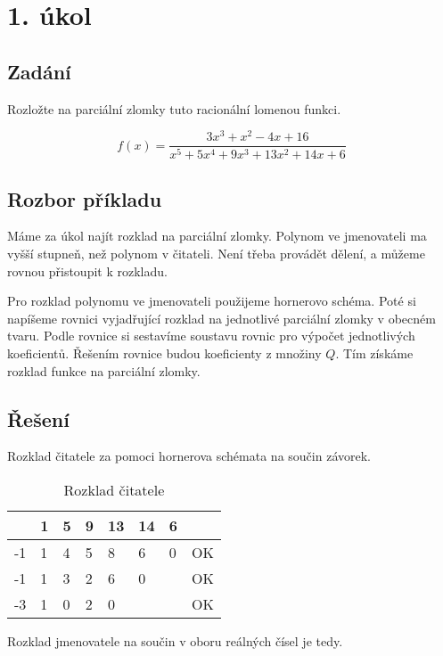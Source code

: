 \section{1. úkol}

\subsection{Zadání}
Rozložte na parciální zlomky tuto racionální lomenou funkci.

\begin{displaymath}
f(x)=\frac{3x^3+x^2-4x+16}{x^5+5x^4+9x^3+13x^2+14x+6}
\end{displaymath}

\subsection{Rozbor příkladu}
Máme za úkol najít rozklad na parciální zlomky. Polynom ve jmenovateli ma vyšší stupneň, než polynom v čitateli. Není třeba provádět dělení, a můžeme rovnou přistoupit k rozkladu.

Pro rozklad polynomu ve jmenovateli použijeme hornerovo schéma. Poté si napíšeme rovnici vyjadřující rozklad na jednotlivé parciální zlomky v obecném tvaru. Podle rovnice si sestavíme soustavu rovnic pro výpočet jednotlivých koeficientů. Řešením rovnice budou koeficienty z množiny $Q$. Tím získáme rozklad funkce na parciální zlomky.

\subsection{Řešení}

Rozklad čitatele za pomoci hornerova schémata na součin závorek.

	\begin{table}[htb]
	\centering
	
	\begin{tabular}{|l|l|l|l|l|l|l|l|}
	\hline
		 & 1 & 5 & 9 & 13 & 14 & 6 &    \\ \hline
	  -1 & 1 & 4 & 5 & 8  & 6  & 0 & OK \\ \hline
	  -1 & 1 & 3 & 2 & 6  & 0  &   & OK \\ \hline
	  -3 & 1 & 0 & 2 & 0  &    &   & OK \\ 
	\hline
	\end{tabular}
	\caption{Rozklad čitatele}
	\end{table}


Rozklad jmenovatele na součin v oboru reálných čísel je tedy. 

